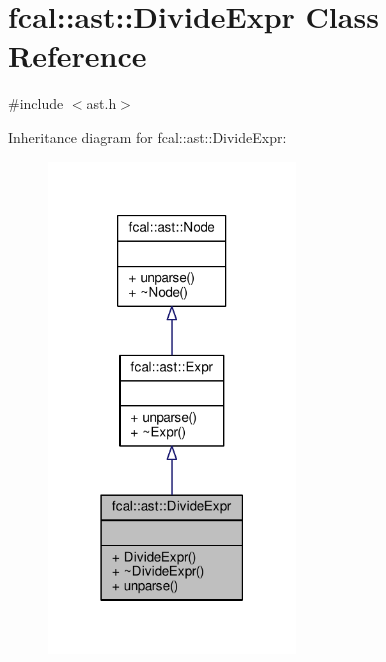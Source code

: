 \hypertarget{classfcal_1_1ast_1_1DivideExpr}{}\section{fcal\+:\+:ast\+:\+:Divide\+Expr Class Reference}
\label{classfcal_1_1ast_1_1DivideExpr}


{\ttfamily \#include $<$ast.\+h$>$}



Inheritance diagram for fcal\+:\+:ast\+:\+:Divide\+Expr\+:
\nopagebreak
\begin{figure}[H]
\begin{center}
\leavevmode
\includegraphics[width=186pt]{classfcal_1_1ast_1_1DivideExpr__inherit__graph}
\end{center}
\end{figure}


